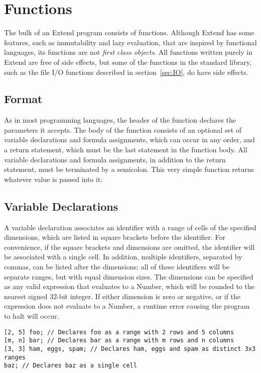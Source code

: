 \section{Functions}
\label{sec:Functions}
The bulk of an Extend program consists of functions. Although Extend has some features, such as immutability and lazy evaluation, that are inspired by functional languages, its functions are not \textit{first class objects}. All functions written purely in Extend are free of side effects, but some of the functions in the standard library, such as the file I/O functions described in section~\ref{sec:IO}, do have side effects.
\subsection{Format}
\label{sec:funcdecl}
As in most programming languages, the header of the function declares the parameters it accepts. The body of the function consists of an optional set of variable declarations and formula assignments, which can occur in any order, and a return statement, which must be the last statement in the function body. All variable declarations and formula assignments, in addition to the return statement, must be terminated by a semicolon.
This very simple function returns whatever value is passed into it:

\subsection{Variable Declarations}
\label{sec:vardecl}
A variable declaration associates an identifier with a range of cells of the specified dimensions, which are listed in square brackets before the identifier. For convenience, if the square brackets and dimensions are omitted, the identifier will be associated with a single cell. In addition, multiple identifiers, separated by commas, can be listed after the dimensions; all of these identifiers will be separate ranges, but with equal dimension sizes. The dimensions can be specified as any valid expression that evaluates to a Number, which will be rounded to the nearest signed 32-bit integer. If either dimension is zero or negative, or if the expression does not evaluate to a Number, a runtime error causing the program to halt will occur.
\begin{lstlisting}
[2, 5] foo; // Declares foo as a range with 2 rows and 5 columns
[m, n] bar; // Declares bar as a range with m rows and n columns
[3, 3] ham, eggs, spam; // Declares ham, eggs and spam as distinct 3x3 ranges
baz; // Declares baz as a single cell
\end{lstlisting}
